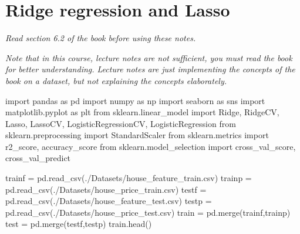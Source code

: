 \documentclass[
  letterpaper,
  DIV=11,
  numbers=noendperiod]{scrreprt}
\newenvironment{Shaded}{\begin{snugshade}}{\end{snugshade}}
\newcommand{\ImportTok}[1]{\textcolor[rgb]{0.00,0.46,0.62}{#1}}
\newcommand{\NormalTok}[1]{\textcolor[rgb]{0.00,0.23,0.31}{#1}}
\newcommand{\OperatorTok}[1]{\textcolor[rgb]{0.37,0.37,0.37}{#1}}
\newcommand{\StringTok}[1]{\textcolor[rgb]{0.13,0.47,0.30}{#1}}
\begin{document}

\chapter{Ridge regression and Lasso}\label{ridge-regression-and-lasso}

\emph{Read section 6.2 of the book before using these notes.}

\emph{Note that in this course, lecture notes are not sufficient, you
must read the book for better understanding. Lecture notes are just
implementing the concepts of the book on a dataset, but not explaining
the concepts elaborately.}

\begin{Shaded}
\begin{Highlighting}[]
\ImportTok{import}\NormalTok{ pandas }\ImportTok{as}\NormalTok{ pd}
\ImportTok{import}\NormalTok{ numpy }\ImportTok{as}\NormalTok{ np}
\ImportTok{import}\NormalTok{ seaborn }\ImportTok{as}\NormalTok{ sns}
\ImportTok{import}\NormalTok{ matplotlib.pyplot }\ImportTok{as}\NormalTok{ plt}
\ImportTok{from}\NormalTok{ sklearn.linear\_model }\ImportTok{import}\NormalTok{ Ridge, RidgeCV, Lasso, LassoCV, LogisticRegressionCV, LogisticRegression}
\ImportTok{from}\NormalTok{ sklearn.preprocessing }\ImportTok{import}\NormalTok{ StandardScaler }
\ImportTok{from}\NormalTok{ sklearn.metrics }\ImportTok{import}\NormalTok{ r2\_score, accuracy\_score}
\ImportTok{from}\NormalTok{ sklearn.model\_selection }\ImportTok{import}\NormalTok{ cross\_val\_score, cross\_val\_predict}
\end{Highlighting}
\end{Shaded}

\begin{Shaded}
\begin{Highlighting}[]
\NormalTok{trainf }\OperatorTok{=}\NormalTok{ pd.read\_csv(}\StringTok{\textquotesingle{}./Datasets/house\_feature\_train.csv\textquotesingle{}}\NormalTok{)}
\NormalTok{trainp }\OperatorTok{=}\NormalTok{ pd.read\_csv(}\StringTok{\textquotesingle{}./Datasets/house\_price\_train.csv\textquotesingle{}}\NormalTok{)}
\NormalTok{testf }\OperatorTok{=}\NormalTok{ pd.read\_csv(}\StringTok{\textquotesingle{}./Datasets/house\_feature\_test.csv\textquotesingle{}}\NormalTok{)}
\NormalTok{testp }\OperatorTok{=}\NormalTok{ pd.read\_csv(}\StringTok{\textquotesingle{}./Datasets/house\_price\_test.csv\textquotesingle{}}\NormalTok{)}
\NormalTok{train }\OperatorTok{=}\NormalTok{ pd.merge(trainf,trainp)}
\NormalTok{test }\OperatorTok{=}\NormalTok{ pd.merge(testf,testp)}
\NormalTok{train.head()}
\end{Highlighting}
\end{Shaded}
\end{document}
